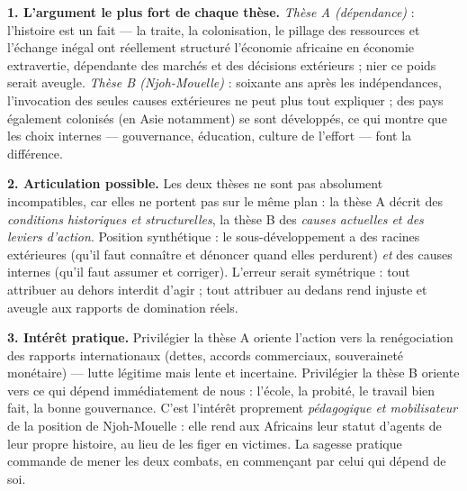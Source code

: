 \documentclass[11pt]{article}
\begin{document}
\begin{corrige}

\textbf{1. L'argument le plus fort de chaque thèse.} \emph{Thèse A (dépendance)} : l'histoire est un fait — la traite, la colonisation, le pillage des ressources et l'échange inégal ont réellement structuré l'économie africaine en économie extravertie, dépendante des marchés et des décisions extérieurs ; nier ce poids serait aveugle. \emph{Thèse B (Njoh-Mouelle)} : soixante ans après les indépendances, l'invocation des seules causes extérieures ne peut plus tout expliquer ; des pays également colonisés (en Asie notamment) se sont développés, ce qui montre que les choix internes — gouvernance, éducation, culture de l'effort — font la différence.

\textbf{2. Articulation possible.} Les deux thèses ne sont pas absolument incompatibles, car elles ne portent pas sur le même plan : la thèse A décrit des \emph{conditions historiques et structurelles}, la thèse B des \emph{causes actuelles et des leviers d'action}. Position synthétique : le sous-développement a des racines extérieures (qu'il faut connaître et dénoncer quand elles perdurent) \emph{et} des causes internes (qu'il faut assumer et corriger). L'erreur serait symétrique : tout attribuer au dehors interdit d'agir ; tout attribuer au dedans rend injuste et aveugle aux rapports de domination réels.

\textbf{3. Intérêt pratique.} Privilégier la thèse A oriente l'action vers la renégociation des rapports internationaux (dettes, accords commerciaux, souveraineté monétaire) — lutte légitime mais lente et incertaine. Privilégier la thèse B oriente vers ce qui dépend immédiatement de nous : l'école, la probité, le travail bien fait, la bonne gouvernance. C'est l'intérêt proprement \emph{pédagogique et mobilisateur} de la position de Njoh-Mouelle : elle rend aux Africains leur statut d'agents de leur propre histoire, au lieu de les figer en victimes. La sagesse pratique commande de mener les deux combats, en commençant par celui qui dépend de soi.
\end{corrige}
\end{document}
